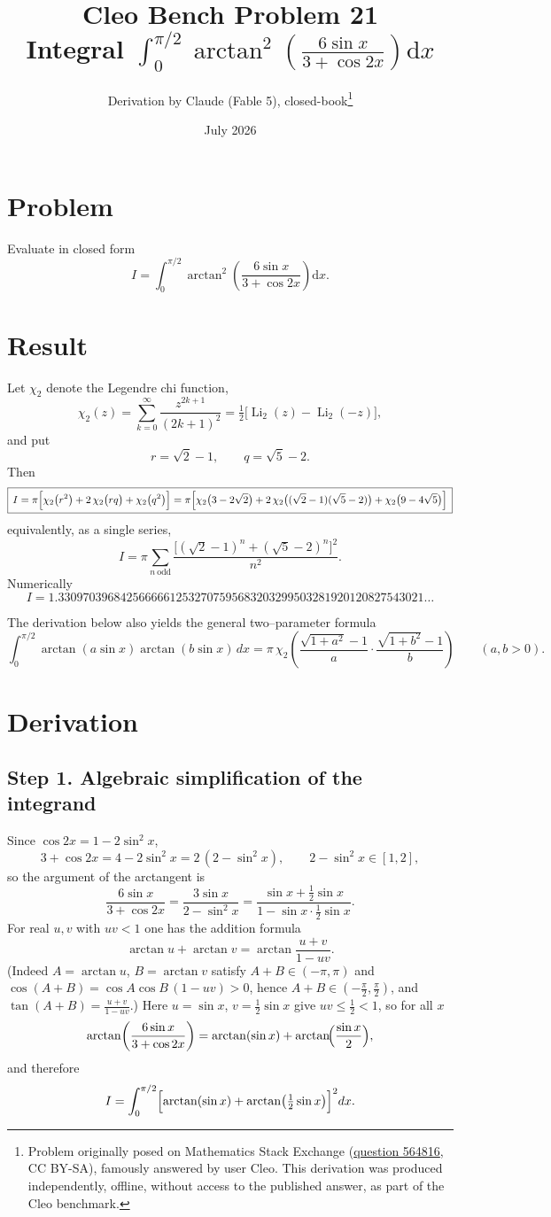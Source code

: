 \documentclass[11pt]{article}
\title{Cleo Bench Problem 21\\[1ex]\large Integral $\int_0^{\pi/2}\arctan^2\left(\frac{6\sin x}{3+\cos 2x}\right)\mathrm dx$}
\author{Derivation by Claude (Fable 5), closed-book\thanks{Problem originally
posed on Mathematics Stack Exchange
(\href{https://math.stackexchange.com/q/564816}{question 564816}, CC BY-SA),
famously answered by user Cleo. This derivation was produced independently,
offline, without access to the published answer, as part of the Cleo benchmark.}}
\date{July 2026}
\theoremstyle{remark}
\begin{document}
\maketitle

\section*{Problem}

Evaluate in closed form
\[
I=\int_0^{\pi/2}\arctan^2\!\left(\frac{6\sin x}{3+\cos 2x}\right)\mathrm dx .
\]

\section*{Result}

Let $\chi_2$ denote the Legendre chi function,
\[
\chi_2(z)=\sum_{k=0}^{\infty}\frac{z^{2k+1}}{(2k+1)^2}=\tfrac12\bigl[\operatorname{Li}_2(z)-\operatorname{Li}_2(-z)\bigr],
\]
and put
\[
r=\sqrt2-1,\qquad q=\sqrt5-2 .
\]
Then
\[
\boxed{\,I=\pi\Bigl[\chi_2\bigl(r^2\bigr)+2\,\chi_2\bigl(rq\bigr)+\chi_2\bigl(q^2\bigr)\Bigr]
=\pi\Bigl[\chi_2\bigl(3-2\sqrt2\bigr)+2\,\chi_2\bigl((\sqrt2-1)(\sqrt5-2)\bigr)+\chi_2\bigl(9-4\sqrt5\bigr)\Bigr]\,}
\]
equivalently, as a single series,
\[
I=\pi\sum_{n\ \mathrm{odd}}\frac{\bigl[(\sqrt2-1)^n+(\sqrt5-2)^n\bigr]^2}{n^2}.
\]
Numerically
\[
I=1.33097039684256666612532707595683203299503281920120827543021\ldots
\]

The derivation below also yields the general two--parameter formula
\[
\int_0^{\pi/2}\arctan(a\sin x)\arctan(b\sin x)\,dx=\pi\,\chi_2\!\left(\frac{\sqrt{1+a^{2}}-1}{a}\cdot\frac{\sqrt{1+b^{2}}-1}{b}\right)\qquad(a,b>0).
\]

\section*{Derivation}

\subsection*{Step 1. Algebraic simplification of the integrand}

Since $\cos 2x=1-2\sin^2x$,
\[
3+\cos 2x=4-2\sin^2 x=2\,(2-\sin^2x),\qquad 2-\sin^2x\in[1,2],
\]
so the argument of the arctangent is
\[
\frac{6\sin x}{3+\cos 2x}=\frac{3\sin x}{2-\sin^2 x}
=\frac{\sin x+\tfrac12\sin x}{1-\sin x\cdot\tfrac12\sin x}.
\]
For real $u,v$ with $uv<1$ one has the addition formula
\[
\arctan u+\arctan v=\arctan\frac{u+v}{1-uv}.
\]
(Indeed $A=\arctan u$, $B=\arctan v$ satisfy $A+B\in(-\pi,\pi)$ and $\cos(A+B)=\cos A\cos B\,(1-uv)>0$, hence $A+B\in(-\tfrac\pi2,\tfrac\pi2)$, and $\tan(A+B)=\frac{u+v}{1-uv}$.)
Here $u=\sin x$, $v=\tfrac12\sin x$ give $uv\le\tfrac12<1$, so for all $x$
\[
\arctan\!\left(\frac{6\sin x}{3+\cos 2x}\right)=\arctan(\sin x)+\arctan\!\Bigl(\frac{\sin x}{2}\Bigr),
\]
and therefore
\[
I=\int_0^{\pi/2}\Bigl[\arctan(\sin x)+\arctan\bigl(\tfrac12\sin x\bigr)\Bigr]^2dx .
\]
\end{document}
